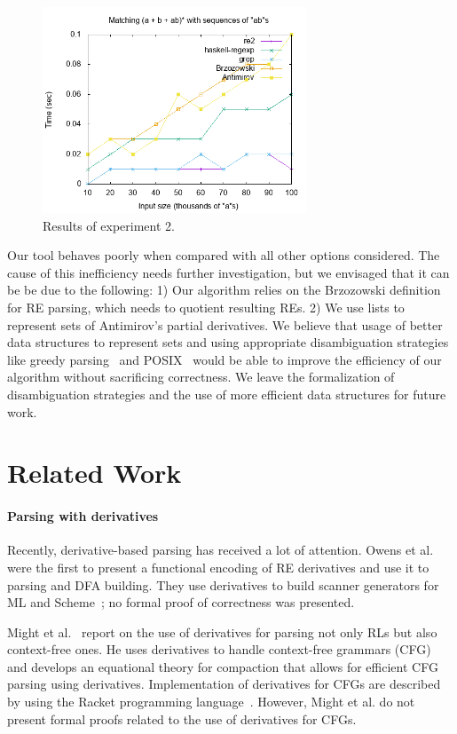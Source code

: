 \documentclass[review]{elsarticle}
\begin{document}
\begin{figure}[!ht]
    \includegraphics[width=0.7\textwidth]{abs.png}
   \centering
   \caption{Results of experiment 2.}
   \label{fig:graph2}
\end{figure}

Our tool behaves poorly when compared with all other options
considered. The cause of this inefficiency needs further
investigation, but we envisaged that it can be be due to the
following: 1) Our algorithm relies on the Brzozowski definition for RE
parsing, which needs to quotient resulting REs. 2) We use lists to
represent sets of Antimirov's partial derivatives. We believe that
usage of better data structures to represent sets and using
appropriate disambiguation strategies like greedy
parsing~\cite{FrischC04} and POSIX~\cite{SulzmannL14} would be able to
improve the efficiency of our algorithm without sacrificing
correctness. We leave the formalization of disambiguation strategies
and the use of more efficient data structures for future work.

\section{Related Work}\label{sec:related}

\paragraph{Parsing with derivatives} Recently, derivative-based
parsing has received a lot of attention. Owens et al. were the first
to present a functional encoding of RE derivatives and use it to
parsing and DFA building. They use derivatives to build scanner
generators for ML and Scheme~\cite{Owens2009}; no formal proof of
correctness was presented.

Might et al.~\cite{Might2011} report on
the use of derivatives for parsing not only RLs but also context-free
ones. He uses derivatives to handle context-free grammars (CFG) and
develops an equational theory for compaction that allows for efficient
CFG parsing using derivatives. Implementation of derivatives for CFGs
are described by using the Racket programming
language~\cite{Felleisen2013}. However, Might et al. do not present
formal proofs related to the use of derivatives for CFGs.
\end{document}
